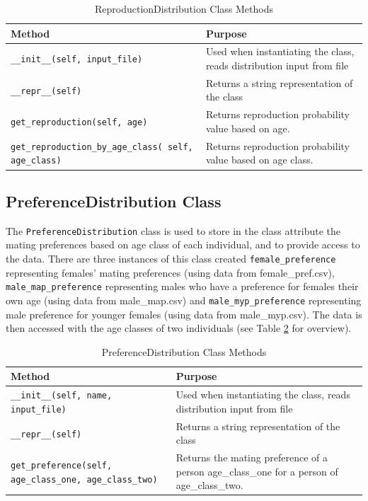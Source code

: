 \documentclass[authoryearcitations]{UoYCSproject}
\begin{document}
\begin{table}[h]
\caption{ReproductionDistribution Class Methods}
\label{tbl:reproductionDistributionMethods}
\begin{tabular}{m{} m{}}
\textbf{Method} & \textbf{Purpose} \\\hline
\texttt{\_\_init\_\_(self, input\_file)} & Used when instantiating the class, reads distribution input from file\\\hline
\texttt{\_\_repr\_\_(self)} & Returns a string representation of the class \\\hline
\texttt{get\_reproduction(self, age)} & Returns reproduction probability value based on age.\\\hline
\small\texttt{get\_reproduction\_by\_age\_class( self, age\_class)} \normalsize &  Returns reproduction probability value based on age class.
\end{tabular}
\end{table}

\newpage
\subsection{PreferenceDistribution Class}
The \texttt{PreferenceDistribution} class is used to store in the class attribute \texttt{} the mating preferences based on age class of each individual, and to provide access to the data. There are three instances of this class created \texttt{female\_preference} representing females' mating preferences (using data from female\_pref.csv), \texttt{male\_map\_preference} representing males who have a preference for females their own age (using data from male\_map.csv) and \texttt{male\_myp\_preference} representing male preference for younger females (using data from male\_myp.csv). The data is then accessed with the age classes of two individuals (see Table \ref{tbl:preferenceDistributionMethods} for overview).

\begin{table}[h]
\caption{PreferenceDistribution Class Methods}
\label{tbl:preferenceDistributionMethods}
\begin{tabular}{m{} m{}}
\textbf{Method} & \textbf{Purpose} \\\hline
\texttt{\_\_init\_\_(self, name, input\_file)} & Used when instantiating the class, reads distribution input from file\\\hline
\texttt{\_\_repr\_\_(self)} & Returns a string representation of the class \\\hline
\texttt{get\_preference(self, age\_class\_one, age\_class\_two)} & Returns the mating preference of a person age\_class\_one for a person of age\_class\_two.
\end{tabular}
\end{table}
\end{document}

